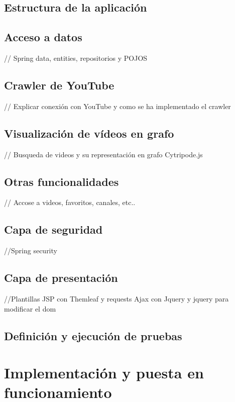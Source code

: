 \documentclass[11pt,a4paper]{article}
\begin{document}
\subsection{Estructura de la aplicación}
\medskip 

\subsection{Acceso a datos}
// Spring data, entities, repositorios y POJOS
\medskip 

\subsection{Crawler de YouTube}
// Explicar conexión con YouTube y como se ha implementado el crawler
\medskip 

\subsection{Visualización de vídeos en grafo}
// Busqueda de videos y su representación en grafo Cytripode.js
\medskip 

\subsection{Otras funcionalidades}
// Accose a videos, favoritos, canales, etc.. 
\medskip 

\subsection{Capa de seguridad}
//Spring security
\medskip 

\subsection{Capa de presentación}
//Plantillas JSP con Themleaf y requests Ajax con Jquery y jquery para modificar el dom
\medskip 

\subsection{Definición y ejecución de pruebas}
\newpage 





\section{Implementación y puesta en funcionamiento}
\bigskip 
\end{document}
